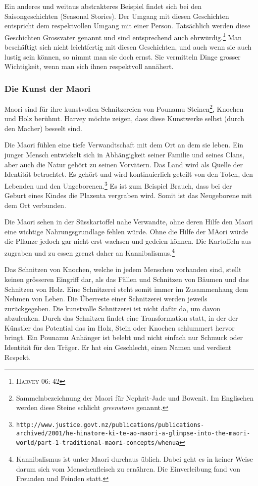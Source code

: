 Ein anderes und weitaus abstrakteres Beispiel findet sich bei den Saisongeschichten (Seasonal Stories). Der Umgang mit diesen Geschichten entspricht dem respektvollen Umgang mit einer Person. Tatsächlich werden diese Geschichten Grossvater genannt und sind entsprechend auch ehrwürdig.\footnote{\textsc{Harvey 06: 42}} Man beschäftigt sich nicht leichtfertig mit diesen Geschichten, und auch wenn sie auch lustig sein können, so nimmt man sie doch ernst. Sie vermitteln Dinge grosser Wichtigkeit, wenn man sich ihnen respektvoll annähert.

\subsubsection*{Die Kunst der Maori}
Maori sind für ihre kunstvollen Schnitzereien von Pounamu Steinen\footnote{Sammelnbezeichnung der Maori für Nephrit-Jade und Bowenit. Im Englischen werden diese Steine schlicht \emph{greenstone} genannt.}, Knochen und Holz berühmt. Harvey möchte zeigen, dass diese Kunstwerke selbst (durch den Macher) beseelt sind. 

Die Maori fühlen eine tiefe Verwandtschaft mit dem Ort an dem sie leben. Ein junger Mensch entwickelt sich in Abhängigkeit seiner Familie und seines Clans, aber auch die Natur gehört zu seinen Vorvätern. Das Land wird als Quelle der Identität betrachtet. Es gehört und wird kontinuierlich geteilt von den Toten, den Lebenden und den Ungeborenen.\footnote{\texttt{http://www.justice.govt.nz/publications/publications-archived/2001/he-hinatore-ki-te-ao-maori-a-glimpse-into-the-maori-world/part-1-traditional-maori-concepts/whenua}} Es ist zum Beispiel Brauch, dass bei der Geburt eines Kindes die Plazenta vergraben wird. Somit ist das Neugeborene mit dem Ort verbunden.

Die Maori sehen in der Süsskartoffel nahe Verwandte, ohne deren Hilfe den Maori eine wichtige Nahrungsgrundlage fehlen würde. Ohne die Hilfe der MAori würde die Pflanze jedoch gar nicht erst wachsen und gedeien können. Die Kartoffeln aus zugraben und zu essen grenzt daher an Kannibalismus.\footnote{Kannibalismus ist unter Maori durchaus üblich. Dabei geht es in keiner Weise darum sich vom Menschenfleisch zu ernähren. Die Einverleibung fand von Freunden und Feinden statt.}

Das Schnitzen von Knochen, welche in jedem Menschen vorhanden sind, stellt keinen grösseren Eingriff dar, als das Fällen und Schnitzen von Bäumen und das Schnitzen von Holz. Eine Schnitzerei steht somit immer im Zusammenhang dem Nehmen von Leben. Die Überreste einer Schnitzerei werden jeweils zurückgegeben. Die kunstvolle Schnitzerei ist nicht dafür da, um davon abzulenken. Durch das Schnitzen findet eine Transformation statt, in der der Künstler das Potential das im Holz, Stein oder Knochen schlummert hervor bringt. Ein Pounamu Anhänger ist belebt und nicht einfach nur Schmuck oder Identität für den Träger. Er hat ein Geschlecht, einen Namen und verdient Respekt. 

